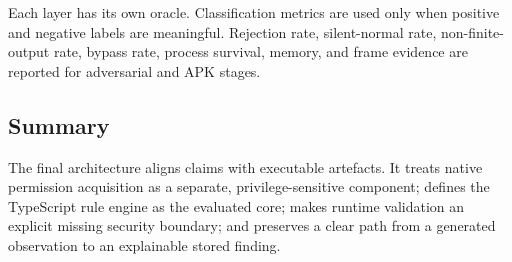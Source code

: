 Each layer has its own oracle. Classification metrics are used only when positive and negative labels are meaningful. Rejection rate, silent-normal rate, non-finite-output rate, bypass rate, process survival, memory, and frame evidence are reported for adversarial and APK stages.

\subsection{Summary}

The final architecture aligns claims with executable artefacts. It treats native permission acquisition as a separate, privilege-sensitive component; defines the TypeScript rule engine as the evaluated core; makes runtime validation an explicit missing security boundary; and preserves a clear path from a generated observation to an explainable stored finding.
